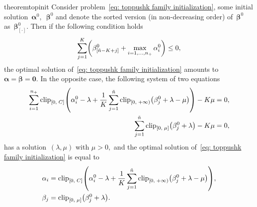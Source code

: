 \begin{restatable}{theorem}{topinit}\label{thm: toppushk family initialization}
  Consider problem~\eqref{eq: toppushk family initialization}, some initial solution~$\bm{\alpha}^0,$~$\bm{\beta}^0$ and denote the sorted version (in non-decreasing order) of~$\bm{\beta}^0$ as~$\bm{\beta}_{[\cdot]}^0.$ Then if the following condition holds
  \begin{equation}\label{eq:problem3_cond}
    \sum_{j = 1}^{K} \Brac{\beta_{[\ntil - K + j]}^0 + \max_{i = 1, \ldots, \npos} \alpha_i^0} \le 0,
  \end{equation}
  the optimal solution of~\eqref{eq: toppushk family initialization} amounts to~$\bm{\alpha} = \bm{\beta} = \bm{0}.$ In the opposite case, the following system of two equations
  \begin{subequations}\label{eq: toppushk family init alg}
    \begin{align}
      \sum_{i=1}^{\npos} \clip{0}{C}{ \alpha_i^0 - \lambda + \frac{1}{K} \sum_{j=1}^{\ntil} \clip[u]{0}{+\infty}{\beta_j^0 + \lambda - \mu}} - K \mu
      & = 0, \label{eq: toppushk family init alg 1} \\
      \sum_{j=1}^{\ntil} \clip{0}{\mu}{\beta_j^0 + \lambda} - K\mu
      & = 0, \label{eq: toppushk family init alg 2}
    \end{align}
  \end{subequations}
  has a solution~$(\lambda, \mu)$ with $\mu > 0,$ and the optimal solution of~\eqref{eq: toppushk family initialization} is equal to
  \begin{align*}
    \alpha_i
      & = \clip{0}{C}{\alpha_i^0 - \lambda + \frac{1}{K} \sum_{j=1}^{\ntil} \clip[u]{0}{+\infty}{\beta_j^0 + \lambda - \mu}}, \\
    \beta_j & = \clip{0}{\mu}{\beta_j^0 + \lambda}.
  \end{align*}
\end{restatable}

